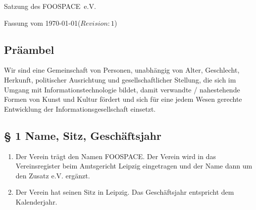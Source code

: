 ﻿\documentclass[10pt,a4paper]{scrartcl}
\newcommand{\qs}[1]{\glqq#1\grqq}
\newcommand{\name}{FOOSPACE}
\newcommand{\revision}{$Revision: 1 $}
\begin{document}
{\LARGE Satzung des \name\ e.V.}

Fassung vom \today (\revision)

\subsection*{Präambel}



Wir sind eine Gemeinschaft von Personen, unabhängig von Alter,
Geschlecht, Herkunft, politischer Ausrichtung und gesellschaftlicher
Stellung, die sich im Umgang mit Informationstechnologie bildet, damit
verwandte / nahestehende Formen von Kunst und Kultur fördert und sich für
eine jedem Wesen gerechte Entwicklung der Informationsgesellschaft
einsetzt.
%
%
\subsection*{§ 1 Name, Sitz, Geschäftsjahr}
\begin{enumerate}
\item Der Verein trägt den Namen \qs{\name}. Der Verein wird in das
Vereinsregister beim Amtsgericht Leipzig eingetragen
und der Name dann um den Zusatz \qs{e.V.} ergänzt.
\item Der Verein hat seinen Sitz in Leipzig. Das Geschäftsjahr entspricht
dem Kalenderjahr.
\end{enumerate}
%
%
\end{document}
